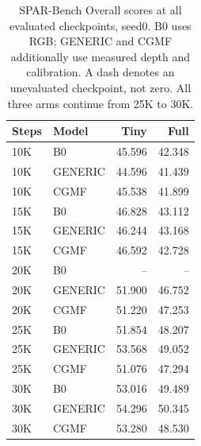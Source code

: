 \begin{table}[t]
\centering\small
\begin{tabular}{@{}llrr@{}}
\toprule
Steps & Model & Tiny & Full \\
\midrule
10K & B0 & 45.596 & 42.348 \\
10K & GENERIC & 44.596 & 41.439 \\
10K & CGMF & 45.538 & 41.899 \\
\midrule
15K & B0 & 46.828 & 43.112 \\
15K & GENERIC & 46.244 & 43.168 \\
15K & CGMF & 46.592 & 42.728 \\
\midrule
20K & B0 & -- & -- \\
20K & GENERIC & 51.900 & 46.752 \\
20K & CGMF & 51.220 & 47.253 \\
\midrule
25K & B0 & 51.854 & 48.207 \\
25K & GENERIC & 53.568 & 49.052 \\
25K & CGMF & 51.076 & 47.294 \\
\midrule
30K & B0 & 53.016 & 49.489 \\
30K & GENERIC & 54.296 & 50.345 \\
30K & CGMF & 53.280 & 48.530 \\
\bottomrule
\end{tabular}
\caption{SPAR-Bench Overall scores at all evaluated checkpoints, seed0. B0 uses RGB; GENERIC and CGMF additionally use measured depth and calibration. A dash denotes an unevaluated checkpoint, not zero. All three arms continue from 25K to 30K.}
\label{tab:main}
\end{table}
